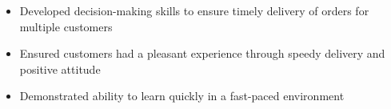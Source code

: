 \begin{itemize}
  \item Developed decision-making skills to ensure timely delivery of orders for multiple customers
  \item Ensured customers had a pleasant experience through speedy delivery and positive attitude
  \item Demonstrated ability to learn quickly in a fast-paced environment
\end{itemize}
\vspace{4pt}
